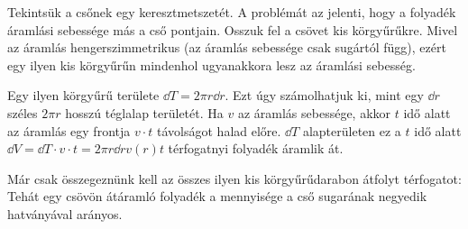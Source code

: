 
\ifdefined\megoldas

 Tekintsük a csőnek egy keresztmetszetét. A problémát az jelenti, hogy a folyadék áramlási sebessége más a cső pontjain. Osszuk fel a csövet kis körgyűrűkre. Mivel az áramlás hengerszimmetrikus (az áramlás sebessége csak sugártól függ), ezért egy ilyen kis körgyűrűn mindenhol ugyanakkora lesz az áramlási sebesség. 
 
 Egy ilyen körgyűrű területe $\dd T=2\pi r \dd r$. Ezt úgy számolhatjuk ki, mint egy $\dd r$ széles $2\pi r$ hosszú téglalap területét.  Ha $v$ az áramlás sebessége, akkor $t$ idő alatt az áramlás egy frontja $v\cdot t$ távolságot halad előre. $\dd T$ alapterületen ez a $t$ idő alatt $\dd V=\dd T\cdot v\cdot t=2\pi r \dd r v(r) t$ térfogatnyi folyadék áramlik át.
 
 Már csak összegeznünk kell az összes ilyen kis körgyűrűdarabon átfolyt térfogatot:
 Tehát egy csövön átáramló folyadék a mennyisége a cső sugarának negyedik hatványával arányos.

\fi